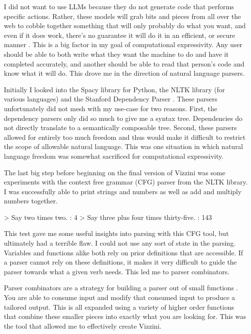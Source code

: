 \documentclass[titlepage]{article}
\newcommand{\langName}{Vizzini}
\begin{document}
I did not want to use LLMs because they do not generate code that performs specific actions. Rather, these models will grab bits and pieces from all over the web to cobble together something that will only probably do what you want, and even if it does work, there's no guarantee it will do it in an efficient, or secure manner \cite{Fu2023SecurityWO}. This is a big factor in my goal of computational expressivity. Any user should be able to both write what they want the machine to do and have it completed accurately, and another should be able to read that person's code and know what it will do. This drove me in the direction of natural language parsers.

Initially I looked into the Spacy library for Python, the NLTK library (for various languages) and the Stanford Dependency Parser \cite{Marneffe2006GeneratingTD}. These parsers unfortunately did not mesh with my use-case for two reasons. First, the dependency parsers only did so much to give me a syntax tree. Dependencies do not directly translate to a semantically composable tree. Second, these parsers allowed for entirely too much freedom and thus would make it difficult to restrict the scope of allowable natural language. This was one situation in which natural language freedom was somewhat sacrificed for computational expressivity.

The last big step before beginning on the final version of \langName{} was some experiments with the context free grammar (CFG) parser from the NLTK library. I was successfully able to print strings and numbers as well as add and multiply numbers together.

\begin{codeblock}[caption={Initial CFG Sample},label={lst:CFGsample}]
> Say two times two.
: 4
> Say three plus four times thirty-five.
: 143
\end{codeblock}

This test gave me some useful insights into parsing with this CFG tool, but ultimately had a terrible flaw. I could not use any sort of state in the parsing. Variables and functions alike both rely on prior definitions that are accessible. If a parser cannot rely on these definitions, it makes it very difficult to guide the parser towards what a given verb needs. This led me to parser combinators.

Parser combinators are a strategy for building a parser out of small functions \cite{Hutton1996MonadicPC}. You are able to consume input and modify that consumed input to produce a tailored output. This is all expanded using a variety of higher order functions that combine these smaller pieces into exactly what you are looking for. This was the tool that allowed me to effectively create \langName{}.
\end{document}
